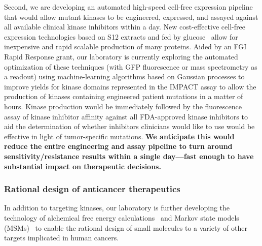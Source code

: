 \documentclass[10pt]{article}
\begin{document}
Second, we are developing an automated high-speed cell-free expression pipeline that would allow mutant kinases to be engineered, expressed, and assayed against all available clinical kinase inhibitors within a day.
New cost-effective cell-free expression technologies based on S12 extracts and fed by glucose~\cite{kim_simple_2006,calhoun_economical_2008} allow for inexpensive and rapid scalable production of many proteins.
Aided by an FGI Rapid Response grant, our laboratory is currently exploring the automated optimization of these techniques (with GFP fluorescence or mass spectrometry as a readout) using machine-learning algorithms based on Gaussian processes to improve yields for kinase domains represented in the IMPACT assay to allow the production of kinases containing engineered patient mutations in a matter of hours.
Kinase production would be immediately followed by the fluorescence assay of kinase inhibitor affinity against all FDA-approved kinase inhibitors to aid the determination of whether inhibitors clinicians would like to use would be effective in light of tumor-specific mutations.
{\bf We anticipate this would reduce the entire engineering and assay pipeline to turn around sensitivity/resistance results within a single day---fast enough to have substantial impact on therapeutic decisions.}

\vspace{-0.3cm}
\subsubsection*{Rational design of anticancer therapeutics}
\vspace{-0.3cm}

In addition to targeting kinases, our laboratory is further developing the technology of alchemical free energy calculations~\cite{chodera:curr-opin-struct-biol:2011:drug-discovery} and Markov state models (MSMs)~\cite{chodera:2006:mms:long-time-dynamics,chodera:jcp:2007,noe:jcp:2011:msm-review} to enable the rational design of small molecules to a variety of other targets implicated in human cancers.
\end{document}
